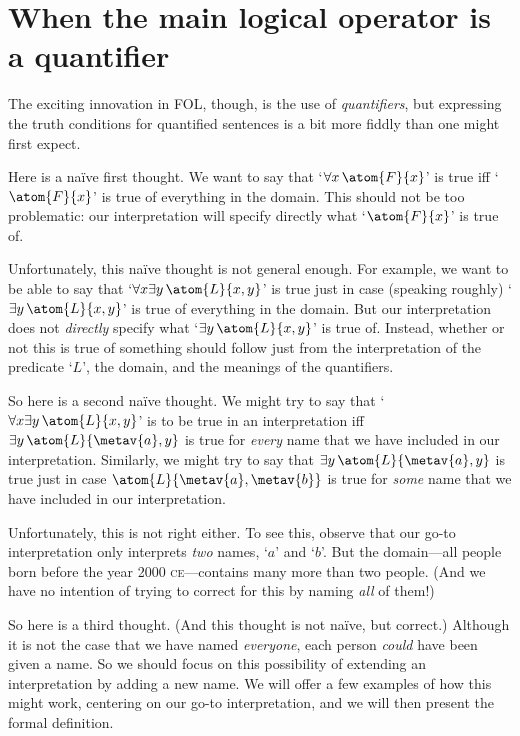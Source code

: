 \section[Quantifiers]{When the main logical operator is a quantifier}\label{s:MainLogicalOperatorQuantifier}
The exciting innovation in FOL, though, is the use of \emph{quantifiers}, but expressing the truth conditions for quantified sentences is a bit more fiddly than one might first expect.

Here is a na\"{i}ve first thought. We want to say that `$\forall x\, \atom{F}{x}$' is true iff `$\atom{F}{x}$' is true of everything in the domain. This should not be too problematic: our interpretation will specify directly what `$\atom{F}{x}$' is true of.

Unfortunately, this na\"{i}ve thought is not general enough. For example, we want to be able to say that `$\forall x \exists y\, \atom{L}{x,y}$' is true just in case (speaking roughly) `$\exists y\, \atom{L}{x,y}$' is true of everything in the domain. But our interpretation does not \emph{directly} specify what `$\exists y\, \atom{L}{x,y}$' is true of. Instead, whether or not this is true of something should follow just from the interpretation of the predicate `$L$', the domain, and the meanings of the quantifiers.

So here is a second na\"{i}ve thought. We might try to say that `$\forall x \exists y\, \atom{L}{x,y}$' is to be true in an interpretation iff $\exists y\, \atom{L}{\metav{a},y}$ is true for \emph{every} name  that we have included in our interpretation. Similarly, we might try to say that $\exists y\, \atom{L}{\metav{a},y}$ is true just in case $\atom{L}{\metav{a},\metav{b}}$ is true for \emph{some} name  that we have included in our interpretation.

Unfortunately, this is not right either. To see this, observe that our go-to interpretation only interprets \emph{two} names, `$a$' and `$b$'. But the domain---all people born before the year 2000 \textsc{ce}---contains many more than two people. (And we have no intention of trying to correct for this by naming \emph{all} of them!)

So here is a third thought. (And this thought is not na\"{i}ve, but correct.) Although it is not the case that we have named \emph{everyone}, each person \emph{could} have been given a name. So we should focus on this possibility of extending an interpretation by adding a new name. We will offer a few examples of how this might work, centering on our go-to interpretation, and we will then present the formal definition.

